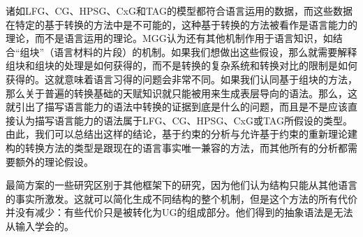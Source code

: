 诸如LFG、CG、HPSG、CxG和TAG的模型都符合语言运用的数据，而这些数据在特定的基于转换的方法中是不可能的，这种基于转换的方法被看作是语言能力的理论，而不是语言运用的理论。MGG认为还有其他机制作用于语言知识，如结合“组块”（语言材料的片段）的机制。如果我们想做出这些假设，那么就需要解释组块和组块的处理是如何获得的，而不是转换的复杂系统和转换对比的限制是如何获得的。这就意味着语言习得的问题会非常不同。如果我们认同基于组块的方法，那么关于普遍的转换基础的天赋知识就只能被用来生成表层导向的语法。那么，这就引出了描写语言能力的语法中转换的证据到底是什么的问题，而且是不是应该直接认为描写语言能力的语法属于LFG、CG、HPSG、CxG或TAG所假设的类型。由此，我们可以总结出这样的结论，基于约束的分析与允许基于约束的重新理论建构的转换方法的类型是跟现在的语言事实唯一兼容的方法，而其他所有的分析都需要额外的理论假设。

最简方案的一些研究区别于其他框架下的研究，因为他们认为结构只能从其他语言的事实所激发。这就可以简化生成不同结构的整个机制，但是这个方法的所有代价并没有减少：有些代价只是被转化为UG的组成部分。他们得到的抽象语法是无法从输入学会的。

